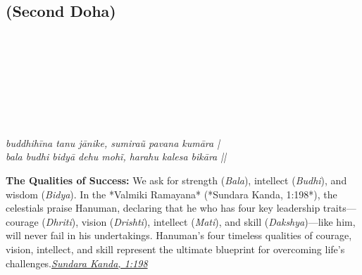 
\newpage

\subsection*{ (Second Doha)}

\begin{minipage}[t]{0.55\textwidth}
\vspace{0pt}

{\large \linespread{1.5}\selectfont
{}\\
\\
\\
\par}

\vspace{0.5em}

{\large \linespread{1.5}\selectfont
{}\\
\\
\\
\par}

\vspace{0.5em}

{\large \linespread{1.3}\selectfont
\textit{buddhihīna tanu jānike, sumiraũ pavana kumāra |}\\
\textit{bala budhi bidyā dehu mohĩ, harahu kalesa bikāra ||}
\par}
\end{minipage}%
\hfill
\begin{minipage}[t]{0.42\textwidth}
\vspace{0pt}
\begin{tcolorbox}[anchorbox]
\textbf{The Qualities of Success:} We ask for strength (\textit{Bala}), intellect (\textit{Budhi}), and wisdom (\textit{Bidya}). In the *Valmiki Ramayana* (*Sundara Kanda, 1:198*), the celestials praise Hanuman, declaring that he who has four key leadership traits—courage (\textit{Dhriti}), vision (\textit{Drishti}), intellect (\textit{Mati}), and skill (\textit{Dakshya})—like him, will never fail in his undertakings.
\vspace{0.5em}\newline Hanuman's four timeless qualities of courage, vision, intellect, and skill represent the ultimate blueprint for overcoming life's challenges.\newline\null\hfill\href{https://www.valmiki.iitk.ac.in/sloka?field_kanda_tid=5&language=dv&field_sarga_value=1}{\textit{Sundara Kanda, 1:198}}
\end{tcolorbox}
\end{minipage}

